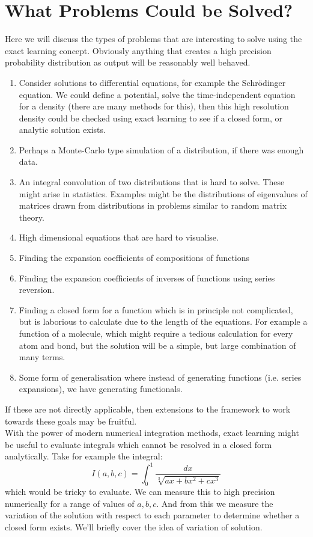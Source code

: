 \documentclass{article}
\begin{document}
\section{What Problems Could be Solved?}
Here we will discuss the types of problems that are interesting to solve using the exact learning concept. Obviously anything that creates a high precision probability distribution as output will be reasonably well behaved. 
\begin{enumerate}
\item Consider solutions to differential equations, for example the Schr\"odinger equation. We could define a potential, solve the time-independent equation for a density (there are many methods for this), then this high resolution density could be checked using exact learning to see if a closed form, or analytic solution exists.
\item Perhaps a Monte-Carlo type simulation of a distribution, if there was enough data.
\item An integral convolution of two distributions that is hard to solve. These might arise in statistics. Examples might be the distributions of eigenvalues of matrices drawn from distributions in problems similar to random matrix theory. \\
\item High dimensional equations that are hard to visualise.
\item Finding the expansion coefficients of compositions of functions
\item Finding the expansion coefficients of inverses of functions using series reversion.
\item Finding a closed form for a function which is in principle not complicated, but is laborious to calculate due to the length of the equations. For example a function of a molecule, which might require a tedious calculation for every atom and bond, but the solution will be a simple, but large combination of many terms.
\item Some form of generalisation where instead of generating functions (i.e. series expansions), we have generating functionals.
\end{enumerate}

If these are not directly applicable, then extensions to the framework to work towards these goals may be fruitful. \\

With the power of modern numerical integration methods, exact learning might be useful to evaluate integrals which cannot be resolved in a closed form analytically. Take for example the integral:
\begin{equation}
I(a,b,c) = \int_0^1 \frac{dx}{\sqrt[3]{a x + b x^2 + cx^3}}
\end{equation}
which would be tricky to evaluate. We can measure this to high precision numerically for a range of  values of $a,b,c$. And from this we measure the variation of the solution with respect to each parameter to determine whether a closed form exists. We'll briefly cover the idea of variation of solution.
\end{document}
